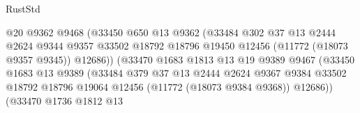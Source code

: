 \begin{lexlean}{RustStd}
\begin{coremodule}
                                        @20
                                        @9362
                                        @9468
                                        (@33450
                                          @650
                                          @13
                                          @9362
                                          (@33484
                                            @302
                                            @37
                                            @13
                                            @2444
                                            @2624
                                            @9344
                                            @9357
                                            @33502
                                            @18792
                                            @18796
                                            @19450
                                            @12456
                                            (@11772 (@18073 @9357 @9345))
                                            @12686))
                                        (@33470
                                          @1683
                                          @1813
                                          @13
                                          @19
                                          @9389
                                          @9467
                                          (@33450
                                            @1683
                                            @13
                                            @9389
                                            (@33484
                                              @379
                                              @37
                                              @13
                                              @2444
                                              @2624
                                              @9367
                                              @9384
                                              @33502
                                              @18792
                                              @18796
                                              @19064
                                              @12456
                                              (@11772 (@18073 @9384 @9368))
                                              @12686))
                                          (@33470
                                            @1736
                                            @1812
                                            @13

\end{coremodule}
\end{lexlean}
